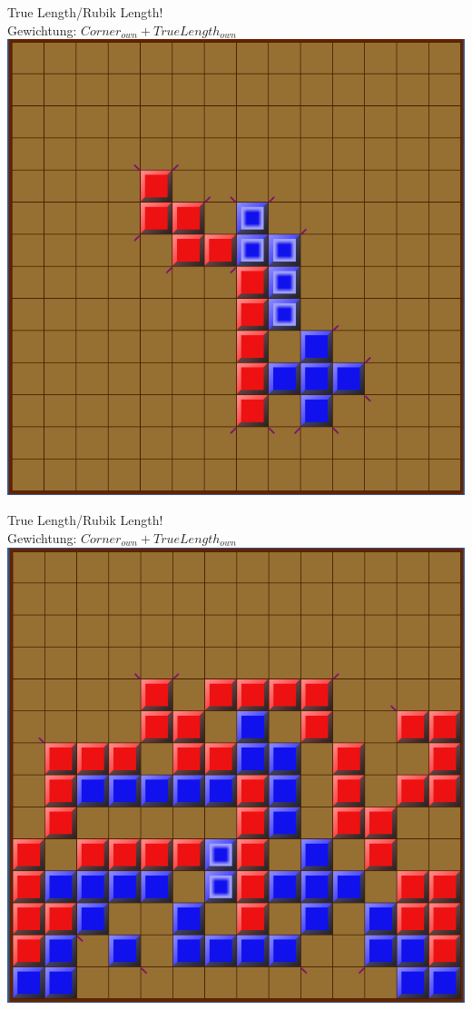 \documentclass[12pt, draft]{beamer}
\begin{document}
\begin{frame}
	True Length/Rubik Length!\\
	Gewichtung: $Corner_{own} + TrueLength_{own}$\\
	\pause
	\includegraphics[width=0.6\linewidth]{media/wgh8.png}
\end{frame}
\begin{frame}
	True Length/Rubik Length!\\
	Gewichtung: $Corner_{own} + TrueLength_{own}$\\
	\includegraphics[width=0.6\linewidth]{media/wgh9.png}
\end{frame}
\end{document}
